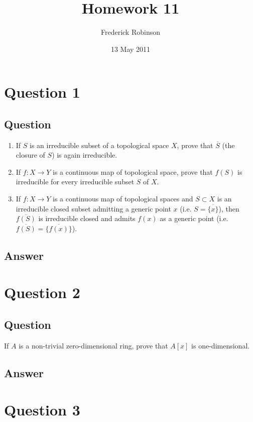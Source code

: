 \documentclass[11pt]{article}
\begin{document}



\title{Homework 11}
\author{Frederick Robinson}
\date{13 May 2011}
\maketitle




\section{Question 1}
\subsection{Question}
\begin{enumerate}
\item If $S$ is an irreducible subset of a topological space $X$, prove that $\overline{S}$ (the closure of $S$) is again irreducible.
\item If $f: X \to Y$ is a continuous map of topological space, prove that $f(S)$ is irreducible for every irreducible subset $S$ of $X$.
\item If $f: X \to Y$ is a continuous map of topological spaces and $S \subset X$ is an irreducible closed subset admitting a generic point $x$ (i.e. $S = \overline{ \{ x\}}$), then $\overline{f(S)}$ is irreducible closed and admits $f(x)$ as a generic point (i.e. $\overline{f(S)} =\overline{ \{ f(x) \}}$).
\end{enumerate}
\subsection{Answer}

\section{Question 2}
\subsection{Question}
If $A$ is a non-trivial zero-dimensional ring, prove that $A[x]$ is one-dimensional.
\subsection{Answer}

\section{Question 3}
\end{document}
